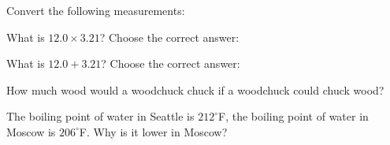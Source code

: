\documentclass[11pt,addpoints]{exam}   	%
\begin{document}
\begin{questions}


\question
Convert the following measurements:


\question[5]
What is $ 12.0 \times 3.21 $? Choose the correct answer:

\begin{choices}
\end{choices}

\question[5]
What is $ 12.0 + 3.21 $? Choose the correct answer:

\begin{choices}
\end{choices}

\question[1]
How much wood would a woodchuck chuck if a woodchuck could chuck
wood?

\question[5]
The boiling point of water in Seattle is $212^{\circ}$F, the boiling point of water in Moscow is $206^{\circ}$F. Why is it lower in Moscow?


\end{questions}
\end{document}
